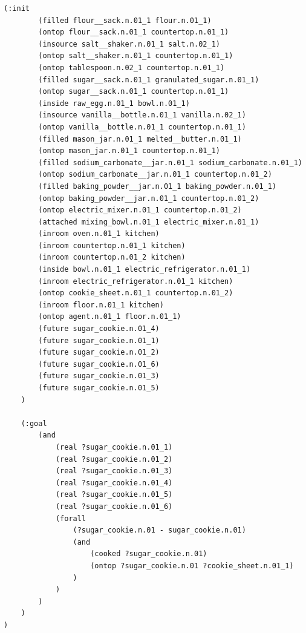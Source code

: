 \begin{minipage}[t]{0.85\textwidth}
\begin{lstlisting}[style = mystyle,
  caption={{\texttt{BakingSugarCookies}}}, label={lst:bddl3}]
    (:init 
        (filled flour__sack.n.01_1 flour.n.01_1)
        (ontop flour__sack.n.01_1 countertop.n.01_1)
        (insource salt__shaker.n.01_1 salt.n.02_1)
        (ontop salt__shaker.n.01_1 countertop.n.01_1)
        (ontop tablespoon.n.02_1 countertop.n.01_1)
        (filled sugar__sack.n.01_1 granulated_sugar.n.01_1)
        (ontop sugar__sack.n.01_1 countertop.n.01_1)
        (inside raw_egg.n.01_1 bowl.n.01_1)
        (insource vanilla__bottle.n.01_1 vanilla.n.02_1)
        (ontop vanilla__bottle.n.01_1 countertop.n.01_1)
        (filled mason_jar.n.01_1 melted__butter.n.01_1)
        (ontop mason_jar.n.01_1 countertop.n.01_1)
        (filled sodium_carbonate__jar.n.01_1 sodium_carbonate.n.01_1)
        (ontop sodium_carbonate__jar.n.01_1 countertop.n.01_2)
        (filled baking_powder__jar.n.01_1 baking_powder.n.01_1)
        (ontop baking_powder__jar.n.01_1 countertop.n.01_2)
        (ontop electric_mixer.n.01_1 countertop.n.01_2)
        (attached mixing_bowl.n.01_1 electric_mixer.n.01_1)
        (inroom oven.n.01_1 kitchen)
        (inroom countertop.n.01_1 kitchen)
        (inroom countertop.n.01_2 kitchen)
        (inside bowl.n.01_1 electric_refrigerator.n.01_1)
        (inroom electric_refrigerator.n.01_1 kitchen)
        (ontop cookie_sheet.n.01_1 countertop.n.01_2)
        (inroom floor.n.01_1 kitchen) 
        (ontop agent.n.01_1 floor.n.01_1)
        (future sugar_cookie.n.01_4) 
        (future sugar_cookie.n.01_1) 
        (future sugar_cookie.n.01_2) 
        (future sugar_cookie.n.01_6) 
        (future sugar_cookie.n.01_3) 
        (future sugar_cookie.n.01_5) 
    )
    
    (:goal 
        (and 
            (real ?sugar_cookie.n.01_1) 
            (real ?sugar_cookie.n.01_2) 
            (real ?sugar_cookie.n.01_3) 
            (real ?sugar_cookie.n.01_4) 
            (real ?sugar_cookie.n.01_5) 
            (real ?sugar_cookie.n.01_6) 
            (forall 
                (?sugar_cookie.n.01 - sugar_cookie.n.01) 
                (and 
                    (cooked ?sugar_cookie.n.01) 
                    (ontop ?sugar_cookie.n.01 ?cookie_sheet.n.01_1)
                )
            )
        )
    )
)
\end{lstlisting}
\end{minipage}


